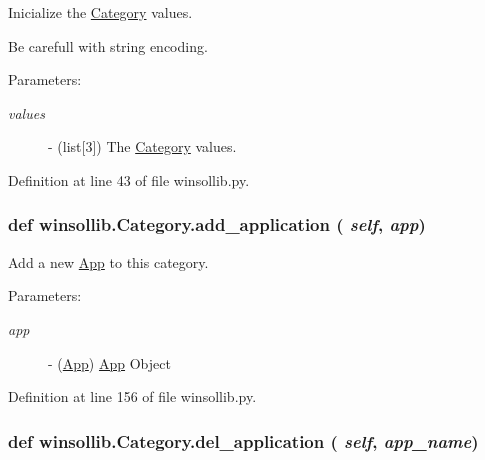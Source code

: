 Inicialize the \hyperlink{classwinsollib_1_1Category}{Category} values. 

Be carefull with string encoding.

\begin{Desc}
\item[Parameters:]
\begin{description}
\item[{\em values}]- (list\mbox{[}3\mbox{]}) The \hyperlink{classwinsollib_1_1Category}{Category} values. \end{description}
\end{Desc}


Definition at line 43 of file winsollib.py.\hypertarget{classwinsollib_1_1Category_605babcbeab710db98ced8441d2ba36e}{
\subsubsection[add\_\-application]{\setlength{\rightskip}{0pt plus 5cm}def winsollib.Category.add\_\-application ( {\em self},  {\em app})}}
\label{classwinsollib_1_1Category_605babcbeab710db98ced8441d2ba36e}


Add a new \hyperlink{classwinsollib_1_1App}{App} to this category. 

\begin{Desc}
\item[Parameters:]
\begin{description}
\item[{\em app}]- (\hyperlink{classwinsollib_1_1App}{App}) \hyperlink{classwinsollib_1_1App}{App} Object \end{description}
\end{Desc}


Definition at line 156 of file winsollib.py.\hypertarget{classwinsollib_1_1Category_1c980dbd591abfb16c9f39a7cfb1e437}{
\subsubsection[del\_\-application]{\setlength{\rightskip}{0pt plus 5cm}def winsollib.Category.del\_\-application ( {\em self},  {\em app\_\-name})}}
\label{classwinsollib_1_1Category_1c980dbd591abfb16c9f39a7cfb1e437}


